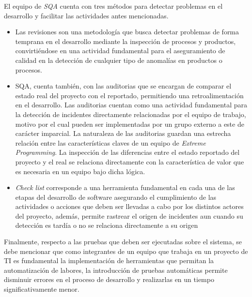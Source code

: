 El equipo de \textit{SQA} cuenta con tres métodos para detectar problemas en el desarrollo y facilitar las actividades antes mencionadas.
\begin{itemize}
\item
Las revisiones son una metodología que busca detectar problemas de forma temprana en el desarrollo mediante la inspección de procesos y productos, convirtiéndose en una actividad fundamental para el aseguramiento de calidad en la detección de cualquier tipo de anomalías en productos o procesos. 
\item
SQA, cuenta también, con las auditorias que se encargan de comparar el estado real del proyecto con el reportado, permitiendo una retroalimentación en el desarrollo. Las auditorias cuentan como una actividad fundamental para la detección de incidentes directamente relacionadas por el equipo de trabajo, motivo por el cual pueden ser implementadas por un grupo externo a este de carácter imparcial. 
La naturaleza de las auditorias guardan una estrecha relación entre las características claves de un equipo de \textit{Extreme Programming}. La inspección de las diferencias entre el estado reportado del proyecto y el real se relaciona directamente con la característica de valor que es necesaria en un equipo bajo dicha lógica.
\item
\textit{Check list} corresponde a una herramienta fundamental en cada una de las etapas del desarrollo de software asegurando el cumplimiento de las actividades o acciones que deben ser llevadas a cabo por los distintos actores del proyecto, además, permite rastrear el origen de incidentes aun cuando su detección es tardía o no se relaciona directamente a su origen
\end{itemize}
Finalmente, respecto a las pruebas que deben ser ejecutadas sobre el sistema, se debe mencionar que como integrantes de un equipo que trabaja en un proyecto de TI es fundamental la implementación de herramientas que permitan la automatización de labores, la introducción de pruebas automáticas permite disminuir errores en el proceso de desarrollo y realizarlas en un tiempo significativamente menor. 
